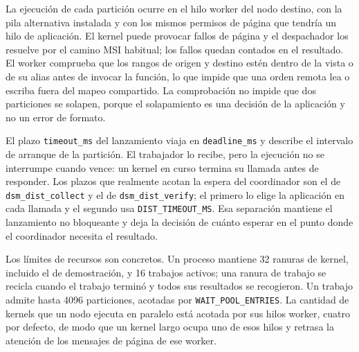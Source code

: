 La ejecución de cada partición ocurre en el hilo worker del nodo destino, con la pila alternativa instalada y con los mismos permisos de página que tendría un hilo de aplicación. El kernel puede provocar fallos de página y el despachador los resuelve por el camino MSI habitual; los fallos quedan contados en el resultado. El worker comprueba que los rangos de origen y destino estén dentro de la vista o de su alias antes de invocar la función, lo que impide que una orden remota lea o escriba fuera del mapeo compartido. La comprobación no impide que dos particiones se solapen, porque el solapamiento es una decisión de la aplicación y no un error de formato.

El plazo \texttt{timeout\_ms} del lanzamiento viaja en \texttt{deadline\_ms} y describe el intervalo de arranque de la partición. El trabajador lo recibe, pero la ejecución no se interrumpe cuando vence: un kernel en curso termina su llamada antes de responder. Los plazos que realmente acotan la espera del coordinador son el de \texttt{dsm\_dist\_collect} y el de \texttt{dsm\_dist\_verify}; el primero lo elige la aplicación en cada llamada y el segundo usa \texttt{DIST\_TIMEOUT\_MS}. Esa separación mantiene el lanzamiento no bloqueante y deja la decisión de cuánto esperar en el punto donde el coordinador necesita el resultado.

Los límites de recursos son concretos. Un proceso mantiene 32 ranuras de kernel, incluido el de demostración, y 16 trabajos activos; una ranura de trabajo se recicla cuando el trabajo terminó y todos sus resultados se recogieron. Un trabajo admite hasta 4096 particiones, acotadas por \texttt{WAIT\_POOL\_ENTRIES}. La cantidad de kernels que un nodo ejecuta en paralelo está acotada por sus hilos worker, cuatro por defecto, de modo que un kernel largo ocupa uno de esos hilos y retrasa la atención de los mensajes de página de ese worker.
